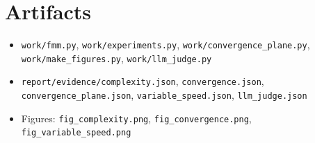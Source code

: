 \documentclass[11pt]{article}
\begin{document}
\section*{Artifacts}
\begin{itemize}
\item \texttt{work/fmm.py}, \texttt{work/experiments.py},
\texttt{work/convergence\_plane.py}, \texttt{work/make\_figures.py},
\texttt{work/llm\_judge.py}
\item \texttt{report/evidence/complexity.json},
\texttt{convergence.json}, \texttt{convergence\_plane.json},
\texttt{variable\_speed.json}, \texttt{llm\_judge.json}
\item Figures: \texttt{fig\_complexity.png}, \texttt{fig\_convergence.png},
\texttt{fig\_variable\_speed.png}
\end{itemize}
\end{document}
